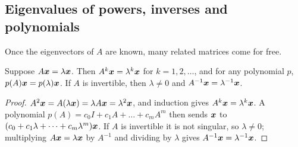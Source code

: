\subsection{Eigenvalues of powers, inverses and polynomials}

Once the eigenvectors of $A$ are known, many related matrices come for free.

\begin{proposition}[Functions of $A$]\label{prop:u23-functions}
Suppose $A\boldsymbol{x}=\lambda\boldsymbol{x}$. Then $A^{k}\boldsymbol{x}=\lambda^{k}\boldsymbol{x}$ for $k=1,2,\dots$, and
for any polynomial $p$, $p(A)\boldsymbol{x}=p(\lambda)\boldsymbol{x}$. If $A$ is invertible, then
$\lambda\neq0$ and $A^{-1}\boldsymbol{x}=\lambda^{-1}\boldsymbol{x}$.
\end{proposition}

\begin{proof}
$A^{2}\boldsymbol{x}=A(\lambda\boldsymbol{x})=\lambda A\boldsymbol{x}=\lambda^{2}\boldsymbol{x}$, and induction gives
$A^{k}\boldsymbol{x}=\lambda^{k}\boldsymbol{x}$. A polynomial $p(A)=c_0I+c_1A+\dots+c_mA^{m}$ then sends
$\boldsymbol{x}$ to $(c_0+c_1\lambda+\dots+c_m\lambda^{m})\boldsymbol{x}$. If $A$ is invertible it is not
singular, so $\lambda\neq0$; multiplying $A\boldsymbol{x}=\lambda\boldsymbol{x}$ by $A^{-1}$ and dividing by
$\lambda$ gives $A^{-1}\boldsymbol{x}=\lambda^{-1}\boldsymbol{x}$.
\end{proof}


